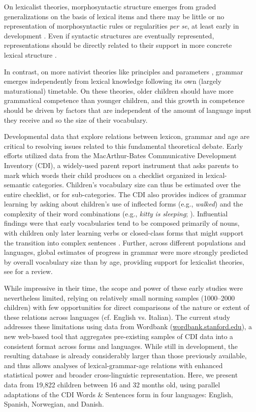 \documentclass[10pt,letterpaper]{article}
\begin{document}
On lexicalist theories, morphosyntactic structure emerges from graded generalizations on the basis of lexical items and there may be little or no representation of morphosyntactic rules or regularities \emph{per se}, at least early in development \cite{tomasello2003}. Even if syntactic structures are eventually represented, representations should be directly related to their support in more concrete lexical structure \cite{bannard2009}.

In contrast, on more nativist theories like principles and parameters \cite{chomsky1981, baker2005}, grammar emerges independently from lexical knowledge following its own (largely maturational) timetable. On these theories, older children should have more grammatical competence than younger children, and this growth in competence should be driven by factors that are independent of the amount of language input they receive and so the size of their vocabulary.

Developmental data that explore relations between lexicon, grammar and age are critical to resolving issues related to this fundamental theoretical debate. Early efforts utilized data from the MacArthur-Bates Communicative Development Inventory (CDI), a widely-used parent report instrument that asks parents to mark which words their child produces on a checklist organized in lexical-semantic categories. Children's vocabulary size can thus be estimated over the entire checklist, or for sub-categories. The CDI also provides indices of grammar learning by asking about children's use of inflected forms (e.g., \emph{walked}) and the complexity of their word combinations (e.g., \emph{kitty is sleeping}; ). Influential findings were that early vocabularies tend to be composed primarily of nouns, with children only later learning verbs or closed-class forms that might support the transition into complex sentences \cite{bates1994}. Further, across different populations and languages, global estimates of progress in grammar were more strongly predicted by overall vocabulary size than by age, providing support for lexicalist theories, see  for a review. 


While impressive in their time, the scope and power of these early studies were nevertheless limited, relying on relatively small norming samples (1000--2000 children) with few opportunities for direct comparisons of the nature or extent of these relations across languages (cf. English vs. Italian). The current study addresses these limitations using data from Wordbank (\url{wordbank.stanford.edu}), a new web-based tool that aggregates pre-existing samples of CDI data into a consistent format across forms and languages. While still in development, the resulting database is already considerably larger than those previously available, and thus allows analyses of lexical-grammar-age relations with enhanced statistical power and broader cross-linguistic representation. Here, we present data from 19,822 children between 16 and 32 months old, using parallel adaptations of the CDI Words \& Sentences form in four languages: English, Spanish, Norwegian, and Danish.
\end{document}
